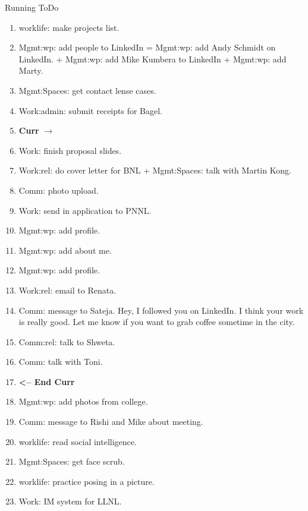 \begin{columns}
\begin{column}{0.6\linewidth}
\begin{block}{Running ToDo}
\begin{enumerate}
      \item \tiny worklife: make projects list. 
      \item \tiny Mgmt:wp: add people to LinkedIn =  Mgmt:wp: add Andy
        Schmidt on LinkedIn. +  Mgmt:wp: add Mike Kumbera to LinkedIn +
        Mgmt:wp: add Marty. 

      \item \tiny Mgmt:Spaces: get contact lense cases. 
  
      \item \tiny Work:admin: submit receipts for Bagel. 

        \tiny \item[] \tiny \textbf{Curr} $\rightarrow$
    
      \item \tiny Work: finish proposal slides. 
      \item \tiny Work:rel: do cover letter for BNL + Mgmt:Spaces: talk with Martin Kong.
        
      \item \tiny Comm: photo upload. 
        
      \item \tiny Work: send in application to PNNL.
        
      \item \tiny Mgmt:wp: add profile.
      \item \tiny Mgmt:wp: add about me. 
        
      \item \tiny Mgmt:wp: add profile. 
\item \tiny Work:rel: email to Renata.  
\item \tiny Comm: message to Sateja. 
  Hey, I followed you on LinkedIn. I think your work is really good. 
  Let me know if you want to grab coffee sometime in the city. 
  
\item \tiny Comm:rel: talk to Shweta.
\item \tiny Comm: talk with Toni. 
  
\item \tiny \textbf{ <-- End Curr }
\item \tiny Mgmt:wp: add photos from college. 
\item \tiny Comm: message to Rishi and Mike about meeting. 
\item \tiny worklife: read social intelligence.  
\item \tiny Mgmt:Spaces: get face scrub. 
\item \tiny worklife: practice posing in a picture.  
\item \tiny Work: IM system for LLNL.  
      \end{enumerate}
    \end{block} 



\end{column}
\end{columns}
